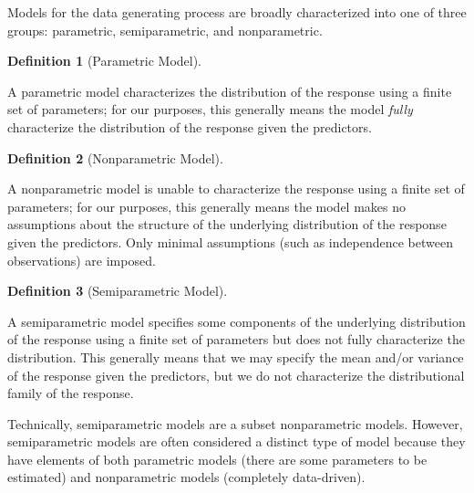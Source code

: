 \documentclass[
  letterpaper,
  DIV=11,
  numbers=noendperiod]{scrreprt}
\theoremstyle{definition}
\theoremstyle{definition}
\newtheorem{definition}{Definition}[chapter]
\theoremstyle{remark}
\begin{document}
Models for the data generating process are broadly characterized into
one of three groups: parametric, semiparametric, and nonparametric.

\begin{definition}[Parametric
Model]\protect\hypertarget{def-parametric-model}{}\label{def-parametric-model}

A parametric model characterizes the distribution of the response using
a finite set of parameters; for our purposes, this generally means the
model \emph{fully} characterize the distribution of the response given
the predictors.

\end{definition}

\begin{definition}[Nonparametric
Model]\protect\hypertarget{def-nonparametric-model}{}\label{def-nonparametric-model}

A nonparametric model is unable to characterize the response using a
finite set of parameters; for our purposes, this generally means the
model makes no assumptions about the structure of the underlying
distribution of the response given the predictors. Only minimal
assumptions (such as independence between observations) are imposed.

\end{definition}

\begin{definition}[Semiparametric
Model]\protect\hypertarget{def-semiparametric-model}{}\label{def-semiparametric-model}

A semiparametric model specifies some components of the underlying
distribution of the response using a finite set of parameters but does
not fully characterize the distribution. This generally means that we
may specify the mean and/or variance of the response given the
predictors, but we do not characterize the distributional family of the
response.

\end{definition}

\begin{tcolorbox}[enhanced jigsaw, bottomrule=.15mm, titlerule=0mm, bottomtitle=1mm, colback=white, coltitle=black, rightrule=.15mm, leftrule=.75mm, toprule=.15mm, toptitle=1mm, left=2mm, opacityback=0, colframe=quarto-callout-note-color-frame, breakable, title=\textcolor{quarto-callout-note-color}{\faInfo}\hspace{0.5em}{Note}, arc=.35mm, colbacktitle=quarto-callout-note-color!10!white, opacitybacktitle=0.6]

Technically, semiparametric models are a subset nonparametric models.
However, semiparametric models are often considered a distinct type of
model because they have elements of both parametric models (there are
some parameters to be estimated) and nonparametric models (completely
data-driven).

\end{tcolorbox}
\end{document}
